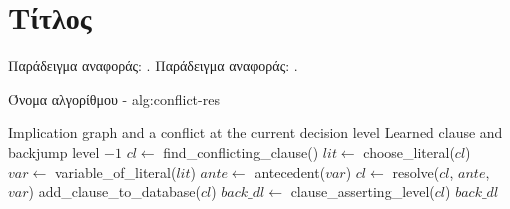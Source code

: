 \section{Τίτλος}

Παράδειγμα αναφοράς: \cite{BALABANOVJIANG2012}.
Παράδειγμα αναφοράς: \cite{papadopoulos2020}.

\begin{myalgorithm}{Όνομα αλγορίθμου - }{alg:conflict-res}
\begin{algorithmic}[1]
    \Require Implication graph and a conflict at the current decision level
    \Ensure Learned clause and backjump level
            \State \Return $-1$
        \EndIf
        \State $cl \gets$ find\_conflicting\_clause()
            \State $lit \gets$ choose\_literal($cl$)
            \State $var \gets$ variable\_of\_literal($lit$)
            \State $ante \gets$ antecedent($var$)
            \State $cl \gets$ resolve($cl$, $ante$, $var$)
        \EndWhile
        \State add\_clause\_to\_database($cl$)
        \State $back\_dl \gets$ clause\_asserting\_level($cl$)
        \State \Return $back\_dl$
    \EndFunction
    \end{algorithmic}
\end{myalgorithm}